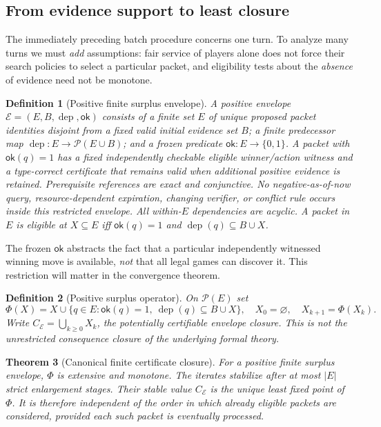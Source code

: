 \documentclass[11pt,letterpaper]{article}
\newtheorem{theorem}{Theorem}[section]
\newtheorem{definition}[theorem]{Definition}
\newcommand{\dep}{\operatorname{dep}}
\newcommand{\calE}{\mathcal E}
\begin{document}
\subsection{From evidence support to least closure}
The immediately preceding batch procedure concerns one turn. To analyze many turns we must \emph{add} assumptions: fair service of players alone does not force their search policies to select a particular packet, and eligibility tests about the \emph{absence} of evidence need not be monotone.
\begin{definition}[Positive finite surplus envelope]\label{def:envelope}
A positive envelope $\calE=(E,B,\dep,\mathsf{ok})$ consists of a finite set $E$ of unique proposed packet identities disjoint from a fixed valid initial evidence set $B$; a finite predecessor map $\dep:E\to\mathcal P(E\cup B)$; and a frozen predicate $\mathsf{ok}:E\to\{0,1\}$. A packet with $\mathsf{ok}(q)=1$ has a fixed independently checkable eligible winner/action witness and a type-correct certificate that remains valid when additional \emph{positive} evidence is retained. Prerequisite references are exact and conjunctive. No negative-as-of-now query, resource-dependent expiration, changing verifier, or conflict rule occurs inside this restricted envelope. All within-$E$ dependencies are acyclic. A packet in $E$ is eligible at $X\subseteq E$ iff $\mathsf{ok}(q)=1$ and $\dep(q)\subseteq B\cup X$.
\end{definition}
The frozen $\mathsf{ok}$ abstracts the fact that a particular independently witnessed winning move is available, \emph{not} that all legal games can discover it. This restriction will matter in the convergence theorem.
\begin{definition}[Positive surplus operator]\label{def:op}
On $\mathcal P(E)$ set
\[
\Phi(X)=X\cup\{q\in E:\mathsf{ok}(q)=1,\ \dep(q)\subseteq B\cup X\},
\quad X_0=\varnothing,\quad X_{k+1}=\Phi(X_k).
\]
Write $C_{\calE}=\bigcup_{k\ge0}X_k$, the \emph{potentially certifiable envelope closure}. This is not the unrestricted consequence closure of the underlying formal theory.
\end{definition}
\begin{theorem}[Canonical finite certificate closure]\label{thm:closure}
For a positive finite surplus envelope, $\Phi$ is extensive and monotone. The iterates stabilize after at most $|E|$ strict enlargement stages. Their stable value $C_{\calE}$ is the unique \emph{least} fixed point of $\Phi$. It is therefore independent of the order in which already eligible packets are considered, provided each such packet is eventually processed.
\end{theorem}
\end{document}
